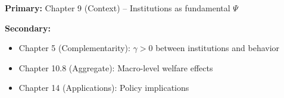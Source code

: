 \begin{tcolorbox}[colback=green!5!white,colframe=green!75!black,title=Chapter Linkage]
\textbf{Primary:} Chapter 9 (Context) -- Institutions as fundamental $\Psi$

\textbf{Secondary:}
\begin{itemize}
    \item Chapter 5 (Complementarity): $\gamma > 0$ between institutions and behavior
    \item Chapter 10.8 (Aggregate): Macro-level welfare effects
    \item Chapter 14 (Applications): Policy implications
\end{itemize}
\end{tcolorbox}

\begin{abstract}
This appendix integrates Daron Acemoglu's research on institutions, automation, and political economy into the Evidence-Based Framework. Acemoglu's work demonstrates that institutions ($\Psi_{inst}$) are the fundamental cause of long-run prosperity differences, while his task-based automation framework shows how technology reshapes labor markets. We formalize six core axioms (AC-1 to AC-6) connecting institutional economics and automation theory to EBF. Key parameters include the automation displacement effect ($\delta_{robot} = -0.20\%$ per robot/1000 workers) and the automation share of wage inequality (50-70\%). Nobel Prize 2024 (with Simon Johnson and James Robinson).
\end{abstract}

